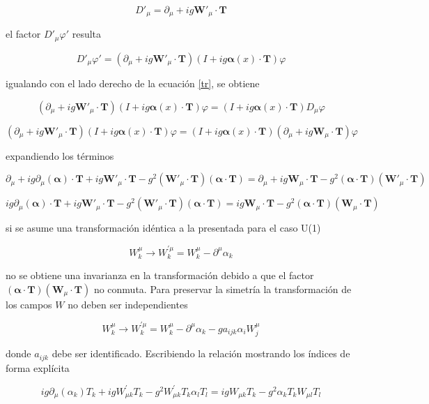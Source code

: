 $$ D'_{\mu} = \partial_{\mu} + ig\textbf{W}'_{\mu}\cdot\textbf{T} $$

el factor $D'_{\mu}\varphi'$ resulta

$$ D'_{\mu}\varphi' = (\partial_{\mu} + ig\textbf{W}'_{\mu}\cdot\textbf{T})(I + ig\boldsymbol\alpha (x) \cdot \textbf{T})\varphi $$

igualando con el lado derecho de la ecuación \ref{tr}, se obtiene

$$ (\partial_{\mu} + ig\textbf{W}'_{\mu}\cdot\textbf{T})(I + ig\boldsymbol\alpha (x) \cdot \textbf{T})\varphi = (I + ig\boldsymbol\alpha (x) \cdot \textbf{T})D_{\mu}\varphi $$

$$ (\partial_{\mu} + ig\textbf{W}'_{\mu}\cdot\textbf{T})(I + ig\boldsymbol\alpha (x) \cdot \textbf{T})\varphi = (I + ig\boldsymbol\alpha (x) \cdot \textbf{T})(\partial_{\mu} + ig\textbf{W}_{\mu}\cdot\textbf{T})\varphi $$

expandiendo los términos

$$ \partial_{\mu} + ig\partial_{\mu}(\boldsymbol\alpha)\cdot \textbf{T} + ig\textbf{W}'_{\mu}\cdot \textbf{T} - g^2(\textbf{W}'_{\mu}\cdot \textbf{T})(\boldsymbol\alpha \cdot\textbf{T}) = \partial_{\mu}+ig\textbf{W}_{\mu}\cdot\textbf{T}  -g^2(\boldsymbol\alpha\cdot\textbf{T})(\textbf{W}'_{\mu}\cdot\textbf{T}) $$

$$ig\partial_{\mu}(\boldsymbol\alpha)\cdot \textbf{T} + ig\textbf{W}'_{\mu}\cdot \textbf{T} - g^2(\textbf{W}'_{\mu}\cdot \textbf{T})(\boldsymbol\alpha \cdot\textbf{T}) =ig\textbf{W}_{\mu}\cdot\textbf{T}  -g^2(\boldsymbol\alpha\cdot\textbf{T})(\textbf{W}_{\mu}\cdot\textbf{T}) $$

si se asume una transformación idéntica a la presentada para el caso U(1)

$$ W_{k}^{\mu} \longrightarrow W_{k}^{'\mu} = W_{k}^{\mu} -\partial^{\mu} \alpha_{k} $$

no se obtiene una invarianza en la transformación debido a que el factor $(\boldsymbol\alpha\cdot\textbf{T})(\textbf{W}_{\mu}\cdot\textbf{T})$ no conmuta. Para preservar la simetría la transformación de los campos $W$ no deben ser independientes

$$ W_k^{\mu} \longrightarrow W_k^{'\mu} = W_k^{\mu} -\partial^{\mu} \alpha_k -g a_{ijk}\alpha_i W_j^{\mu} $$

donde $a_{ijk}$ debe ser identificado. Escribiendo la relación mostrando los índices de forma explícita

$$ ig\partial_{\mu}(\alpha_k)T_k + igW_{\mu k}^{'}T_k - g^2W_{\mu k }^{'}T_k\alpha_lT_l = igW_{\mu k}T_k - g^2 \alpha_kT_kW_{\mu l}T_l $$

